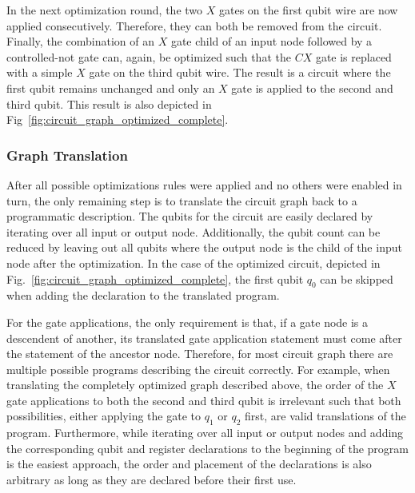 In the next optimization round, the two $X$ gates on the first qubit wire are now applied consecutively. Therefore, they can both be removed from the circuit. Finally, the combination of an $X$ gate child of an input node followed by a controlled-not gate can, again, be optimized such that the $CX$ gate is replaced with a simple $X$ gate on the third qubit wire. The result is a circuit where the first qubit remains unchanged and only an $X$ gate is applied to the second and third qubit. This result is also depicted in Fig~\ref{fig:circuit_graph_optimized_complete}.   

\subsubsection{Graph Translation}
After all possible optimizations rules were applied and no others were enabled in turn, the only remaining step is to translate the circuit graph back to a programmatic description. The qubits for the circuit are easily declared by iterating over all input or output node. Additionally, the qubit count can be reduced by leaving out all qubits where the output node is the child of the input node after the optimization. In the case of the optimized circuit, depicted in Fig.~\ref{fig:circuit_graph_optimized_complete}, the first qubit $q_0$ can be skipped when adding the declaration to the translated program. 

For the gate applications, the only requirement is that, if a gate node is a descendent of another, its translated gate application statement must come after the statement of the ancestor node. Therefore, for most circuit graph there are multiple possible programs describing the circuit correctly. For example, when translating the completely optimized graph described above, the order of the $X$ gate applications to both the second and third qubit is irrelevant such that both possibilities, \ie either applying the gate to $q_1$ or $q_2$ first, are valid translations of the program. Furthermore, while iterating over all input or output nodes and adding the corresponding qubit and register declarations to the beginning of the program is the easiest approach, the order and placement of the declarations is also arbitrary as long as they are declared before their first use. 